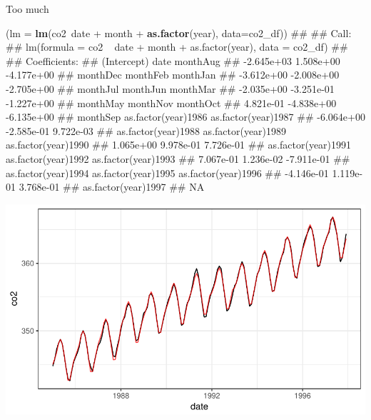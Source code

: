 \documentclass[11pt,ignorenonframetext,]{beamer}
\newenvironment{Shaded}{}{}
\newcommand{\KeywordTok}[1]{\textcolor[rgb]{0.00,0.44,0.13}{\textbf{{#1}}}}
\newcommand{\DataTypeTok}[1]{\textcolor[rgb]{0.56,0.13,0.00}{{#1}}}
\newcommand{\StringTok}[1]{\textcolor[rgb]{0.25,0.44,0.63}{{#1}}}
\newcommand{\NormalTok}[1]{{#1}}
\let\oldShaded\Shaded
\let\endoldShaded\endShaded
\renewenvironment{Shaded}{\footnotesize\begin{spacing}{0.9}\oldShaded}{\endoldShaded\end{spacing}}
\begin{document}
\begin{frame}[fragile]{Too much}

\begin{Shaded}
\begin{Highlighting}[]
\NormalTok{(}\DataTypeTok{lm =} \KeywordTok{lm}\NormalTok{(co2~date +}\StringTok{ }\NormalTok{month +}\StringTok{ }\KeywordTok{as.factor}\NormalTok{(year), }\DataTypeTok{data=}\NormalTok{co2_df))}
\NormalTok{## }
\NormalTok{## Call:}
\NormalTok{## lm(formula = co2 ~ date + month + as.factor(year), data = co2_df)}
\NormalTok{## }
\NormalTok{## Coefficients:}
\NormalTok{##         (Intercept)                 date             monthAug  }
\NormalTok{##          -2.645e+03            1.508e+00           -4.177e+00  }
\NormalTok{##            monthDec             monthFeb             monthJan  }
\NormalTok{##          -3.612e+00           -2.008e+00           -2.705e+00  }
\NormalTok{##            monthJul             monthJun             monthMar  }
\NormalTok{##          -2.035e+00           -3.251e-01           -1.227e+00  }
\NormalTok{##            monthMay             monthNov             monthOct  }
\NormalTok{##           4.821e-01           -4.838e+00           -6.135e+00  }
\NormalTok{##            monthSep  as.factor(year)1986  as.factor(year)1987  }
\NormalTok{##          -6.064e+00           -2.585e-01            9.722e-03  }
\NormalTok{## as.factor(year)1988  as.factor(year)1989  as.factor(year)1990  }
\NormalTok{##           1.065e+00            9.978e-01            7.726e-01  }
\NormalTok{## as.factor(year)1991  as.factor(year)1992  as.factor(year)1993  }
\NormalTok{##           7.067e-01            1.236e-02           -7.911e-01  }
\NormalTok{## as.factor(year)1994  as.factor(year)1995  as.factor(year)1996  }
\NormalTok{##          -4.146e-01            1.119e-01            3.768e-01  }
\NormalTok{## as.factor(year)1997  }
\NormalTok{##                  NA}
\end{Highlighting}
\end{Shaded}

\end{frame}

\begin{frame}{}

\includegraphics{Lec3_files/figure-beamer/unnamed-chunk-6-1.pdf}

\end{frame}
\end{document}
